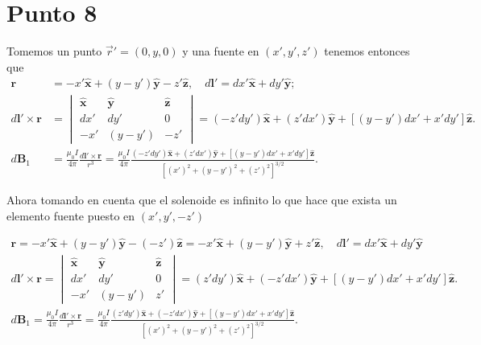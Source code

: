\documentclass{report}
\begin{document}
\chapter{Punto 8}

Tomemos un punto $\vec{r}' = \left(0, y, 0\right)$ y una fuente en $\left(x', y', z'\right)$ tenemos entonces que
\begin{align*}
	\mathbf{r} &= -x' \hat{\mathbf{x}} + (y - y') \hat{\mathbf{y}} - z' \hat{\mathbf{z}}, \quad d\mathbf{l}' = dx' \hat{\mathbf{x}} + dy' \hat{\mathbf{y}};\\
	d\mathbf{l}' \times \mathbf{r} &=
	\begin{vmatrix}
	\hat{\mathbf{x}} & \hat{\mathbf{y}} & \hat{\mathbf{z}} \\
	dx' & dy' & 0 \\
	-x' & (y - y') & -z'
	\end{vmatrix}
	= (-z' dy') \hat{\mathbf{x}} + (z' dx') \hat{\mathbf{y}} + [(y - y') dx' + x' dy'] \hat{\mathbf{z}}.\\
	d\mathbf{B}_1 &= \frac{\mu_0 I}{4\pi} \frac{d\mathbf{l}' \times \mathbf{r}}{r^3} = \frac{\mu_0 I}{4\pi} \frac{(-z' dy') \hat{\mathbf{x}} + (z' dx') \hat{\mathbf{y}} + [(y - y') dx' + x' dy'] \hat{\mathbf{z}}}{[(x')^2 + (y - y')^2 + (z')^2]^{3/2}}.
\end{align*}

Ahora tomando en cuenta que el solenoide es infinito lo que hace que exista un elemento fuente puesto en $\left(x', y', -z'\right)$

\begin{align*}
	\mathbf{r} = -x' \hat{\mathbf{x}} + (y - y') \hat{\mathbf{y}} - (-z') \hat{\mathbf{z}} = -x' \hat{\mathbf{x}} + (y - y') \hat{\mathbf{y}} + z' \hat{\mathbf{z}}, \quad d\mathbf{l}' = dx' \hat{\mathbf{x}} + dy' \hat{\mathbf{y}}\\
	d\mathbf{l}' \times \mathbf{r} =
\begin{vmatrix}
\hat{\mathbf{x}} & \hat{\mathbf{y}} & \hat{\mathbf{z}} \\
dx' & dy' & 0 \\
-x' & (y - y') & z'
\end{vmatrix}
= (z' dy') \hat{\mathbf{x}} + (-z' dx') \hat{\mathbf{y}} + [(y - y') dx' + x' dy'] \hat{\mathbf{z}}.\\
d\mathbf{B}_1 = \frac{\mu_0 I}{4\pi} \frac{d\mathbf{l}' \times \mathbf{r}}{r^3} = \frac{\mu_0 I}{4\pi} \frac{(z' dy') \hat{\mathbf{x}} + (-z' dx') \hat{\mathbf{y}} + [(y - y') dx' + x' dy'] \hat{\mathbf{z}}}{[(x')^2 + (y - y')^2 + (z')^2]^{3/2}}.
\end{align*}
\end{document}
